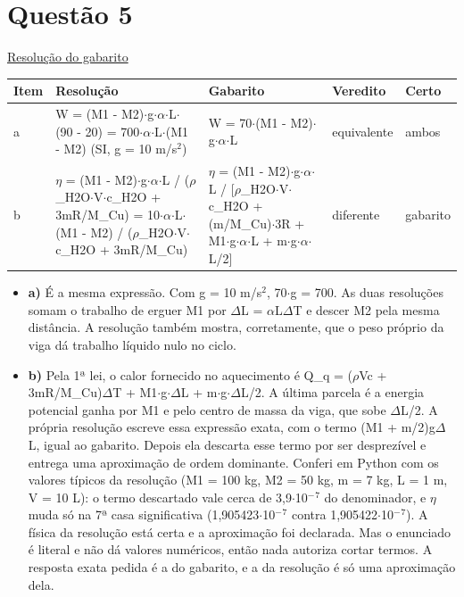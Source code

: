 \documentclass{article}%
\begin{document}
\section*{Questão 5}%
\href{https://poliedroresolve.sistemapoliedro.com.br/vestibulares/ita/2026/ita-2-fase-dia-3-30-10-2025-2-fase-dia-3/dissertativa-5-fisica-2-fase-dia-3-ita-2026}{Resolução do gabarito}\par\smallskip%
\begin{longtable}{@{}p{} p{} p{} p{} p{}@{}}\toprule Item & Resolução & Gabarito & Veredito & Certo \\ \midrule
a & W = (M1 - M2)$\cdot$g$\cdot$$\alpha$$\cdot$L$\cdot$(90 - 20) = 700$\cdot$$\alpha$$\cdot$L$\cdot$(M1 - M2) (SI, g = 10 m/s$^2$) & W = 70$\cdot$(M1 - M2)$\cdot$g$\cdot$$\alpha$$\cdot$L & equivalente & ambos \\
b & $\eta$ = (M1 - M2)$\cdot$g$\cdot$$\alpha$$\cdot$L / ($\rho$\_H2O$\cdot$V$\cdot$c\_H2O + 3mR/M\_Cu) = 10$\cdot$$\alpha$$\cdot$L$\cdot$(M1 - M2) / ($\rho$\_H2O$\cdot$V$\cdot$c\_H2O + 3mR/M\_Cu) & $\eta$ = (M1 - M2)$\cdot$g$\cdot$$\alpha$$\cdot$L / {[}$\rho$\_H2O$\cdot$V$\cdot$c\_H2O + (m/M\_Cu)$\cdot$3R + M1$\cdot$g$\cdot$$\alpha$$\cdot$L + m$\cdot$g$\cdot$$\alpha$$\cdot$L/2{]} & diferente & gabarito \\
\bottomrule\end{longtable}%
\begin{itemize}%
\item%
\textbf{a)} É a mesma expressão. Com g = 10 m/s$^2$, 70$\cdot$g = 700. As duas resoluções somam o trabalho de erguer M1 por $\Delta$L = $\alpha$L$\Delta$T e descer M2 pela mesma distância. A resolução também mostra, corretamente, que o peso próprio da viga dá trabalho líquido nulo no ciclo.%
\item%
\textbf{b)} Pela 1ª lei, o calor fornecido no aquecimento é Q\_q = ($\rho$Vc + 3mR/M\_Cu)$\Delta$T + M1$\cdot$g$\cdot$$\Delta$L + m$\cdot$g$\cdot$$\Delta$L/2. A última parcela é a energia potencial ganha por M1 e pelo centro de massa da viga, que sobe $\Delta$L/2. A própria resolução escreve essa expressão exata, com o termo (M1 + m/2)g$\Delta$L, igual ao gabarito. Depois ela descarta esse termo por ser desprezível e entrega uma aproximação de ordem dominante. Conferi em Python com os valores típicos da resolução (M1 = 100 kg, M2 = 50 kg, m = 7 kg, L = 1 m, V = 10 L): o termo descartado vale cerca de 3,9$\cdot$10$^{-}$$^{7}$ do denominador, e $\eta$ muda só na 7ª casa significativa (1,905423$\cdot$10$^{-}$$^{7}$ contra 1,905422$\cdot$10$^{-}$$^{7}$). A física da resolução está certa e a aproximação foi declarada. Mas o enunciado é literal e não dá valores numéricos, então nada autoriza cortar termos. A resposta exata pedida é a do gabarito, e a da resolução é só uma aproximação dela.%
\end{itemize}%
\end{document}
